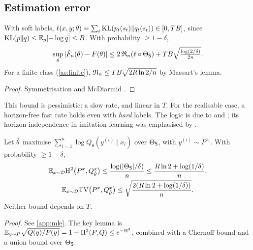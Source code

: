 \subsection{Estimation error}\label{sec:estimation}

\begin{theorem}\label{thm:unif}
 With soft labels, $\ell(x,y;\theta)=\sum_t\mathrm{KL}(p_t(s_t)\|q_t(s_t))\in[0,TB]$, since
$\mathrm{KL}(p\|q)\le\mathbb{E}_p[-\log q]\le B$. With probability $\ge1-\delta$,
\[
\sup_\theta|\hat F_n(\theta)-F(\theta)|\le2\,\mathfrak{R}_n(\ell\circ\Theta_{\mathsf{S}})+TB\sqrt{\tfrac{\log(2/\delta)}{2n}}.
\]
For a finite class (\cref{as:finite}), $\mathfrak{R}_n\le TB\sqrt{2R\ln2/n}$ by Massart's lemma.
\end{theorem}
\begin{proof}
Symmetrisation and McDiarmid \citep{bartlett2002rademacher}.
\end{proof}
\noindent
This bound is pessimistic: a slow rate, and linear in $T$. For the realisable case, a
horizon-free fast rate holds even with \emph{hard} labels. The logic is due to
\citet{zhang2006epsilon} and \citet{wong1995probability}; its horizon-independence in imitation learning
was emphasised by \citet{foster2024behavior}.

\begin{theorem}\label{thm:mle}
 Let $\hat\theta$ maximise $\sum_{i=1}^n\log Q_\theta(y^{(i)}\mid x_i)$ over
$\Theta_{\mathsf{S}}$, with $y^{(i)}\sim P^{x_i}$. With probability $\ge1-\delta$,
\begin{gather*}
\mathbb{E}_{x\sim\mathcal{D}}\mathrm{H}^2\big(P^{x},Q^x_{\hat\theta}\big)\le\frac{\log(|\Theta_{\mathsf{S}}|/\delta)}n\le\frac{R\ln2+\log(1/\delta)}n,\\
\mathbb{E}_{x\sim\mathcal{D}}\mathrm{TV}\big(P^{x},Q^x_{\hat\theta}\big)\le\sqrt{\frac{2(R\ln2+\log(1/\delta))}n}.
\end{gather*}
Neither bound depends on $T$.
\end{theorem}
\noindent\emph{Proof.} See \cref{app:mle}. The key lemma is
$\mathbb{E}_{y\sim P}\sqrt{Q(y)/P(y)}=1-\mathrm{H}^2(P,Q)\le e^{-\mathrm{H}^2}$, combined with a Chernoff bound and a union
bound over $\Theta_{\mathsf{S}}$.

